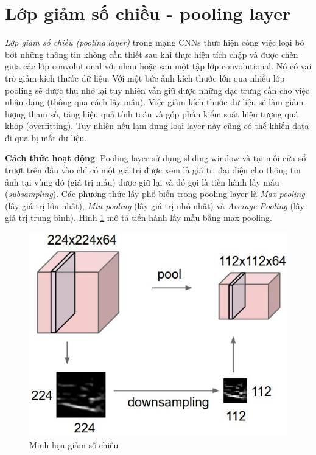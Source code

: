 \section{Lớp giảm số chiều -  pooling layer}
\textit{Lớp giảm số chiều (pooling layer)} trong mạng CNNs thực hiện công việc loại bỏ bớt những thông tin không cần thiết sau khi thực hiện tích chập và được chèn giữa các lớp convolutional với nhau hoặc sau một tập lớp convolutional. Nó có vai trò giảm kích thước dữ liệu. Với một bức ảnh kích thước lớn qua nhiều lớp pooling sẽ được thu nhỏ lại tuy nhiên vẫn giữ được những đặc trưng cần cho việc nhận dạng (thông qua cách lấy mẫu). Việc giảm kích thước dữ liệu sẽ làm giảm lượng tham số, tăng hiệu quả tính toán và góp phần kiểm soát hiện tượng quá khớp (overfitting). Tuy nhiên nếu lạm dụng loại layer này cũng có thể khiến data đi qua bị mất dữ liệu.\par
\textbf{Cách thức hoạt động}: Pooling layer sử dụng sliding window và tại mỗi cửa sổ trượt trên đầu vào chỉ có một giá trị được xem là giá trị đại diện cho thông tin ảnh tại vùng đó (giá trị mẫu) được giữ lại và đó gọi là tiến hành lấy mẫu (\textit{subsampling}). Các phương thức lấy phổ biến trong pooling layer là \textit{Max pooling} (lấy giá trị lớn nhất), \textit{Min pooling} (lấy giá trị nhỏ nhất) và \textit{Average Pooling} (lấy giá trị trung bình). Hình \ref{fig:pool} mô tả tiến hành lấy mẫu bằng max pooling.\par

\begin{center}
\begin{figure}[H]
	\begin{center}
		\includegraphics[scale=0.5]{chap4/image/poolEx.jpeg}
	\end{center}
	\caption{Minh họa giảm số chiều}
	\label{fig:pool}
\end{figure}
\end{center}

